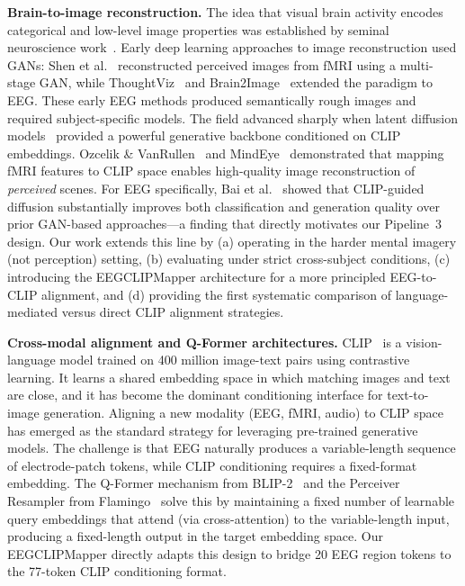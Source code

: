 \documentclass{article}
\begin{document}
\textbf{Brain-to-image reconstruction.}
The idea that visual brain activity encodes categorical and low-level image properties was established by seminal neuroscience work~\citep{haxby2001distributed,kay2008identifying}. Early deep learning approaches to image reconstruction used GANs: Shen et al.~\citep{shen2019end} reconstructed perceived images from fMRI using a multi-stage GAN, while ThoughtViz~\citep{tirupattur2018thoughtviz} and Brain2Image~\citep{kavasidis2017brain2image} extended the paradigm to EEG. These early EEG methods produced semantically rough images and required subject-specific models. The field advanced sharply when latent diffusion models~\citep{rombach2022ldm} provided a powerful generative backbone conditioned on CLIP embeddings. Ozcelik \& VanRullen~\citep{ozcelik2023brain} and MindEye~\citep{scotti2024mindeye} demonstrated that mapping fMRI features to CLIP space enables high-quality image reconstruction of \emph{perceived} scenes. For EEG specifically, Bai et al.~\citep{bai2023brain} showed that CLIP-guided diffusion substantially improves both classification and generation quality over prior GAN-based approaches---a finding that directly motivates our Pipeline~3 design. Our work extends this line by (a) operating in the harder mental imagery (not perception) setting, (b) evaluating under strict cross-subject conditions, (c) introducing the EEGCLIPMapper architecture for a more principled EEG-to-CLIP alignment, and (d) providing the first systematic comparison of language-mediated versus direct CLIP alignment strategies.

\textbf{Cross-modal alignment and Q-Former architectures.}
CLIP~\citep{radford2021clip} is a vision-language model trained on 400 million image-text pairs using contrastive learning. It learns a shared embedding space in which matching images and text are close, and it has become the dominant conditioning interface for text-to-image generation. Aligning a new modality (EEG, fMRI, audio) to CLIP space has emerged as the standard strategy for leveraging pre-trained generative models. The challenge is that EEG naturally produces a variable-length sequence of electrode-patch tokens, while CLIP conditioning requires a fixed-format embedding. The Q-Former mechanism from BLIP-2~\citep{li2023blip2} and the Perceiver Resampler from Flamingo~\citep{alayrac2022flamingo} solve this by maintaining a fixed number of learnable query embeddings that attend (via cross-attention) to the variable-length input, producing a fixed-length output in the target embedding space. Our EEGCLIPMapper directly adapts this design to bridge 20 EEG region tokens to the 77-token CLIP conditioning format.
\end{document}
